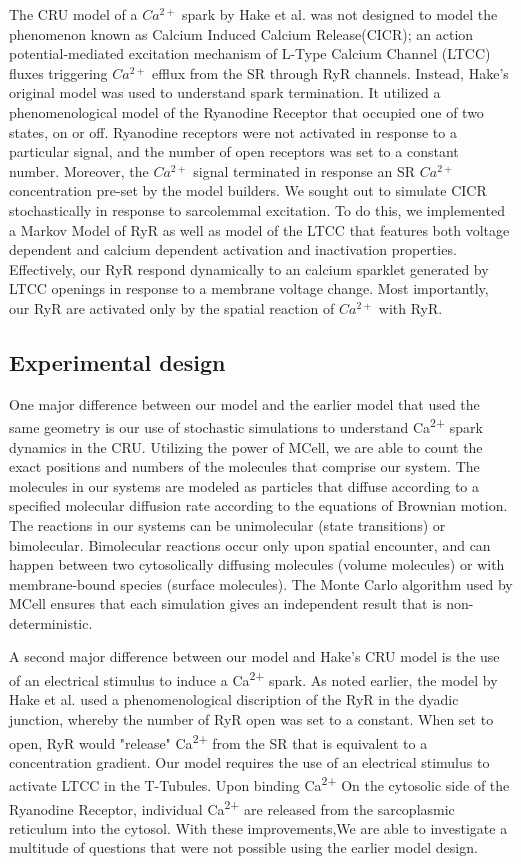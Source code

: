 \documentclass[12pt]{ucsddissertation}
\begin{document}
The CRU model of a $Ca^{2+}$ spark by Hake et al. \cite{Hake2012} was not designed to model the phenomenon known as Calcium Induced Calcium Release(CICR); an action potential-mediated excitation mechanism of L-Type Calcium Channel (LTCC) fluxes triggering $Ca^{2+}$ efflux from the SR through RyR channels. Instead, Hake's original model was used to understand spark termination. It utilized a phenomenological model of the Ryanodine Receptor that occupied one of two states, on or off. Ryanodine receptors were not activated in response to a particular signal, and the number of open receptors was set to a constant number. Moreover, the $Ca^{2+}$ signal terminated in response an SR $Ca^{2+}$ concentration pre-set by the model builders. We sought out to simulate CICR stochastically in response to sarcolemmal excitation. To do this, we implemented a Markov Model of RyR \cite{Saftenku2001} as well as model of the LTCC \cite{Greenstein2002} that features both voltage dependent and calcium dependent activation and inactivation properties. Effectively, our RyR respond dynamically to an calcium sparklet generated by LTCC openings in response to a membrane voltage change. Most importantly, our RyR are activated only by the spatial reaction of $Ca^{2+}$ with RyR.

\subsection{Experimental design}
One major difference between our model and the earlier model that used the same geometry \cite{Hake2012} is our use of stochastic simulations to understand Ca\textsuperscript{2+} spark dynamics in the CRU. Utilizing the power of MCell, we are able to count the exact positions and numbers of the molecules that comprise our system.  The molecules in our systems are modeled as particles that diffuse according to a specified molecular diffusion rate according to the equations of Brownian motion\cite{Stiles2001a}. The reactions in our systems can be unimolecular (state transitions) or bimolecular. Bimolecular reactions occur only upon spatial encounter,  and can happen between two cytosolically diffusing molecules (volume molecules) or with membrane-bound species (surface molecules). The Monte Carlo  algorithm used by MCell ensures that each simulation gives an independent result that is non-deterministic.

A second major difference between our model and Hake's CRU model is the use of an electrical stimulus to induce a Ca\textsuperscript{2+} spark. As noted earlier, the model by Hake et al. used a phenomenological discription of the RyR in the dyadic junction, whereby the number of RyR open was set to a constant. When set to open, RyR would "release" Ca\textsuperscript{2+} from the SR that is equivalent to a concentration gradient. Our model requires the use of an electrical stimulus to activate LTCC in the T-Tubules. Upon binding Ca\textsuperscript{2+} On the cytosolic side of the Ryanodine Receptor, individual  Ca\textsuperscript{2+} are released from the sarcoplasmic reticulum into the cytosol. With these improvements,We are able to investigate a multitude of questions that were not possible using the earlier model design.
\end{document}
